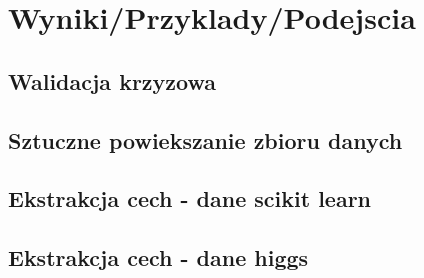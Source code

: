 \section{Wyniki/Przyklady/Podejscia} \label{results}
\subsection{Walidacja krzyzowa}
\subsection{Sztuczne powiekszanie zbioru danych}
\subsection{Ekstrakcja cech - dane scikit learn}
\subsection{Ekstrakcja cech - dane higgs}
